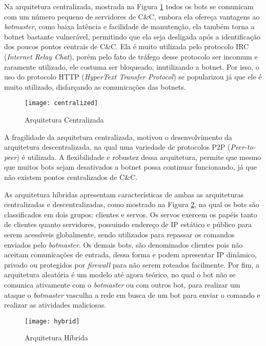 Na arquitetura centralizada, mostrada na Figura \ref{fig:centralized_architecture} todos os bots se comunicam com um número pequeno de servidores de C\&C, embora ela ofereça vantagens ao \textit{botmaster}, como baixa latência e facilidade de manutenção, ela também torna a botnet bastante vulnerável, permitindo que ela seja desligada após a identificação dos poucos pontos centrais de C\&C. Ela é muito utilizada pelo protocolo IRC (\textit{Internet Relay Chat}), porém pelo fato de tráfego desse protocolo ser incomum e raramente utilizado, ele costuma ser bloqueado, inutilizando a botnet. Por isso, o uso do protocolo HTTP (\textit{HyperText Transfer Protocol}) se popularizou já que ele é muito utilizado, disfarçando as comunicações das botnets.

\begin{figure}
\texttt{[image: centralized]}
\caption[Arquitetura Centralizada]{Arquitetura Centralizada\cite{wang2010advanced}} \label{fig:centralized_architecture}
\end{figure}

A fragilidade da arquitetura centralizada, motivou o desenvolvimento da arquitetura descentralizada, na qual uma variedade de protocolos P2P (\textit{Peer-to-peer}) é utilizada. A flexibilidade e robustez dessa arquitetura, permite que mesmo que muitos bots sejam desativados a botnet possa continuar funcionando, já que não existem pontos centralizados de C\&C. 

As arquitetura híbridas apresentam características de ambas as arquiteturas centralizadas e descentralizadas, como mostrado na Figura \ref{fig:hybrid_architecture}, na qual os bots são classificados em dois grupos: clientes e servos. Os servos exercem os papéis tanto de clientes quanto servidores, possuindo endereço de IP estático e público para serem acessíveis globalmente, sendo utilizados para repassar os comandos enviados pelo \textit{botmaster}. Os demais bots, são denominados clientes pois não aceitam comunicações de entrada, dessa forma e podem apresentar IP dinâmico, privado ou protegidos por \textit{firewall} para não serem roteados facilmente. Por fim, a arquitetura aleatória é um modelo até agora teórico, no qual o bot não se comunica ativamente com o \textit{botmaster} ou com outros bot, para realizar um ataque o \textit{botmaster} vasculha a rede em busca de um bot para enviar o comando e realizar as atividades maliciosas.

\begin{figure}
\texttt{[image: hybrid]}
\caption[Arquitetura Híbrida]{Arquitetura Híbrida\cite{wang2010advanced}} \label{fig:hybrid_architecture}
\end{figure}


